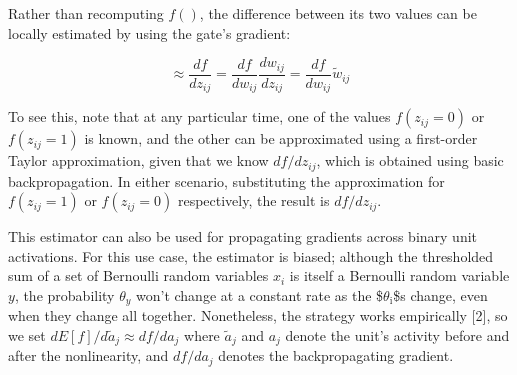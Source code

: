 \documentclass[11pt]{article}
\begin{document}
Rather than recomputing \(f()\), the difference between its two values can be locally estimated by using the gate's gradient:

$$
\approx \frac{df}{dz_{ij}}
= \frac{df}{dw_{ij}} \frac{dw_{ij}}{dz_{ij}}  = \frac{df}{dw_{ij}} \widetilde{w}_{ij}
$$

To see this, note that at any particular time, one of the values \(f(z_{ij}=0)\) or \(f(z_{ij}=1)\) is known, and the other can be approximated using a first-order Taylor approximation, given that we know \(df/dz_{ij}\), which is obtained using basic backpropagation. In either scenario, substituting the approximation for \(f(z_{ij}=1)\) or \(f(z_{ij}=0)\) respectively, the result is \(df/dz_{ij}\).

This estimator can also be used for propagating gradients across binary unit activations. For this use case, the estimator is biased; although the thresholded sum of a set of Bernoulli random variables \(x_i\) is itself a Bernoulli random variable \(y\), the probability \(\theta_y\) won't change at a constant rate as the \$\(\theta_{\text{i}}\)\$s change, even when they change all together. Nonetheless, the strategy works empirically [2], so we set \(dE[f]/d\tilde{a}_j \approx df/da_j\) where \(\tilde{a}_j\) and \(a_j\) denote the unit's activity before and after the nonlinearity, and \(df/da_j\) denotes the backpropagating gradient.
\end{document}

